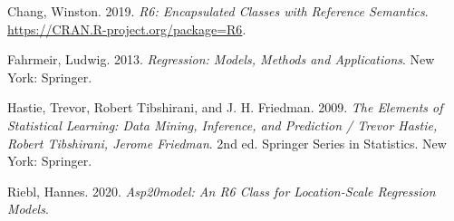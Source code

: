 \documentclass[
]{report}
\begin{document}
\hypertarget{refs}{}
\leavevmode\hypertarget{ref-R-R6}{}%
Chang, Winston. 2019. \emph{R6: Encapsulated Classes with Reference
Semantics}. \url{https://CRAN.R-project.org/package=R6}.

\leavevmode\hypertarget{ref-Fahrmeir.2013}{}%
Fahrmeir, Ludwig. 2013. \emph{Regression: Models, Methods and
Applications}. New York: Springer.

\leavevmode\hypertarget{ref-Hastie.2009}{}%
Hastie, Trevor, Robert Tibshirani, and J. H. Friedman. 2009. \emph{The
Elements of Statistical Learning: Data Mining, Inference, and Prediction
/ Trevor Hastie, Robert Tibshirani, Jerome Friedman}. 2nd ed. Springer
Series in Statistics. New York: Springer.

\leavevmode\hypertarget{ref-R-asp20model}{}%
Riebl, Hannes. 2020. \emph{Asp20model: An R6 Class for Location-Scale
Regression Models}.
\end{document}
